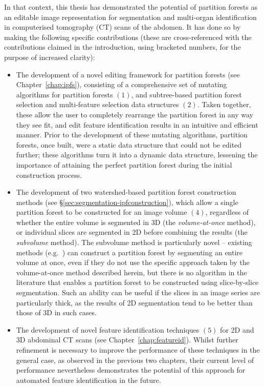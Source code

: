 In that context, this thesis has demonstrated the potential of partition forests as an editable image representation for segmentation and multi-organ identification in computerised tomography (CT) scans of the abdomen. It has done so by making the following specific contributions (these are cross-referenced with the contributions claimed in the introduction, using bracketed numbers, for the purpose of increased clarity):
%
\begin{itemize}

\item The development of a novel editing framework for partition forests (see Chapter~\ref{chap:ipfs}), consisting of a comprehensive set of mutating algorithms for partition forests $(1)$, and subtree-based partition forest selection and multi-feature selection data structures $(2)$. Taken together, these allow the user to completely rearrange the partition forest in any way they see fit, and edit feature identification results in an intuitive and efficient manner. Prior to the development of these mutating algorithms, partition forests, once built, were a static data structure that could not be edited further; these algorithms turn it into a dynamic data structure, lessening the importance of attaining the perfect partition forest during the initial construction process.

\item The development of two watershed-based partition forest construction methods (see \S\ref{sec:segmentation-ipfconstruction}), which allow a single partition forest to be constructed for an image volume $(4)$, regardless of whether the entire volume is segmented in 3D (the \emph{volume-at-once} method), or individual slices are segmented in 2D before combining the results (the \emph{subvolume} method). The subvolume method is particularly novel -- existing methods (e.g.~\cite{yu02,marfil07}) can construct a partition forest by segmenting an entire volume at once, even if they do not use the specific approach taken by the volume-at-once method described herein, but there is no algorithm in the literature that enables a partition forest to be constructed using slice-by-slice segmentation. Such an ability can be useful if the slices in an image series are particularly thick, as the results of 2D segmentation tend to be better than those of 3D in such cases.

\item The development of novel feature identification techniques $(5)$ for 2D and 3D abdominal CT scans (see Chapter~\ref{chap:featureid}). Whilst further refinement is necessary to improve the performance of these techniques in the general case, as observed in the previous two chapters, their current level of performance nevertheless demonstrates the potential of this approach for automated feature identification in the future.

\end{itemize}

